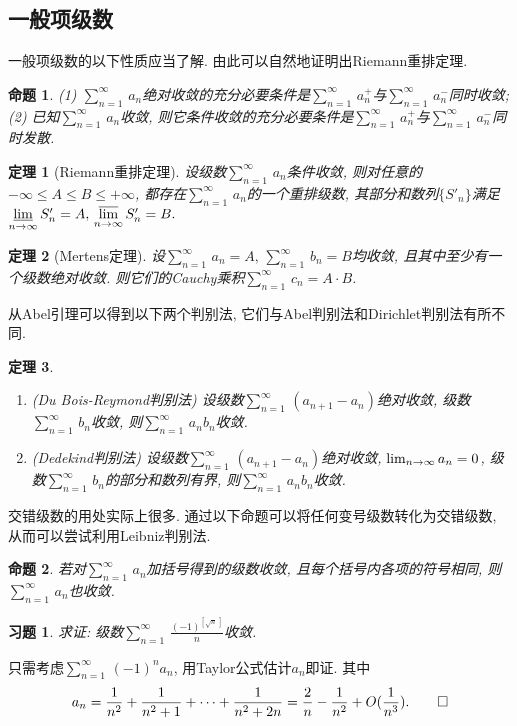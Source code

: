 \documentclass[11pt,a4paper]{ctexart}
\makeatletter
\theoremstyle{thmseries} %
\newtheorem{thm}{定理}[section]
\newtheorem{prop}{命题}[section]
\theoremstyle{exerseries}
\newtheorem{exer}{习题}[section]
\renewenvironment{proof}[1][\proofname]{\par
  \pushQED{\qed}%
  \normalfont \topsep6\p@\@plus6\p@\relax
  \trivlist
  \item[\hskip\labelsep
        \itshape
    #1\@addpunct{}]\ignorespaces
}{%
  \popQED\endtrivlist\@endpefalse
}
\newenvironment{pf}{\begin{proof}[\bfseries\upshape 证\quad]}{\end{proof}}
\DeclareMathOperator{\llim}{\underset{\nti}{\underline{\lim}}}
\DeclareMathOperator{\ulim}{\underset{\nti}{\overline{\lim}}}
\def \nti {\mathnormal{n}\to\infty}
\def \tseries {{\textstyle\sum\limits_{n=1}^{\infty}}\,} %
\def \vs {\vspace{-1em}}
\makeatother
\begin{document}
\subsection{一般项级数}
一般项级数的以下性质应当了解. 由此可以自然地证明出Riemann重排定理. 
\begin{prop}
	\textnormal{(1)} $\tseries a_n$绝对收敛的充分必要条件是$\tseries a_n^+$与$\tseries a_n^-$同时收敛;
	\textnormal{(2)} 已知$\tseries a_n$收敛, 则它条件收敛的充分必要条件是$\tseries a_n^+$与$\tseries a_n^-$同时发散. 
\end{prop}

\begin{thm}[Riemann重排定理]
	设级数$\tseries a_n$条件收敛, 则对任意的$-\infty\leq A\leq B\leq +\infty$, 都存在$\tseries a_n$的一个重排级数, 其部分和数列$\{S'_n\}$满足$\llim S'_n=A,\,\ulim S'_n=B.$
\end{thm}

\begin{thm}[Mertens定理]
	设$\tseries a_n=A,\,\tseries b_n=B$均收敛, 且其中至少有一个级数绝对收敛. 则它们的Cauchy乘积$\tseries c_n=A\cdot B$. 
\end{thm}

从Abel引理可以得到以下两个判别法, 它们与Abel判别法和Dirichlet判别法有所不同. 
\begin{thm}
	\phantom{text}
	\begin{enumerate}
		\item (Du Bois-Reymond判别法) 设级数$\tseries(a_{n+1}-a_n)$绝对收敛, 级数$\tseries b_n$收敛, 则$\tseries a_nb_n$收敛. 
		\item (Dedekind判别法) 设级数$\tseries(a_{n+1}-a_n)$绝对收敛, $\lim_{\nti}a_n=0$, 级数$\tseries b_n$的部分和数列有界, 则$\tseries a_nb_n$收敛. 
	\end{enumerate}
\end{thm}

交错级数的用处实际上很多. 通过以下命题可以将任何变号级数转化为交错级数, 从而可以尝试利用Leibniz判别法. 
\begin{prop}
	若对$\tseries a_n$加括号得到的级数收敛, 且每个括号内各项的符号相同, 则$\tseries a_n$也收敛. 
\end{prop}

\begin{exer}
	求证: 级数$\tseries\frac{(-1)^{[\sqrt{n}\,]}}{n}$收敛. 
\end{exer}
\begin{pf}
	只需考虑$\tseries(-1)^na_n$, 用Taylor公式估计$a_n$即证. 其中\vs
	\[a_n=\frac{1}{n^2}+\frac{1}{n^2+1}+\cdots+\frac{1}{n^2+2n}=\frac{2}{n}-\frac{1}{n^2}+O(\frac{1}{n^3}).\qedhere\]
\end{pf}
\end{document}
